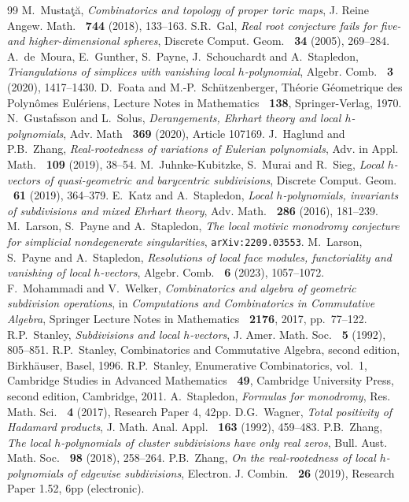 \documentclass[11pt]{amsart}
\begin{document}
\begin{thebibliography}{99}
M.~Musta\c{t}\u{a},
\textit{Combinatorics and topology of proper toric
maps},
J. Reine Angew. Math. {\bf~744} (2018), 133--163.
%
S.R.~Gal,
\textit{Real root conjecture fails for five- 
and higher-dimensional spheres},
Discrete Comput. Geom. {\bf~34} (2005), 269--284.
%
A.~de~Moura, E.~Gunther, S.~Payne, J.~Schouchardt
and A.~Stapledon,
\textit{Triangulations of simplices with vanishing 
local $h$-polynomial},
Algebr. Comb. {\bf~3} (2020), 1417--1430.
%
D.~Foata and M.-P.~Sch\"utzenberger,
Th\'eorie G\'eometrique des Polyn\^omes Eul\'eriens,
Lecture Notes in Mathematics {\bf~138}, 
Springer-Verlag, 1970.
%  
N.~Gustafsson and L.~Solus, 
\textit{Derangements, Ehrhart theory and local 
$h$-polynomials}, 
Adv. Math {\bf~369} (2020), Article 107169.
%
J.~Haglund and P.B.~Zhang,
\textit{Real-rootedness of variations of Eulerian 
polynomials},
Adv. in Appl. Math. {\bf~109} (2019), 38--54.
%
M.~Juhnke-Kubitzke, S.~Murai and R.~Sieg,
\textit{Local $h$-vectors of quasi-geometric and 
barycentric subdivisions},
Discrete Comput. Geom. {\bf~61} (2019), 364--379.
%
E.~Katz and A.~Stapledon,
\textit{Local $h$-polynomials, invariants of 
subdivisions and mixed Ehrhart theory},
Adv. Math. {\bf~286} (2016), 181--239.
%
M.~Larson, S.~Payne and A.~Stapledon,
\textit{The local motivic monodromy conjecture
for simplicial nondegenerate singularities},
{\tt arXiv:2209.03553}.
%
M.~Larson, S.~Payne and A.~Stapledon,
\textit{Resolutions of local face modules, 
functoriality and vanishing of local $h$-vectors},
Algebr. Comb. {\bf~6} (2023), 1057--1072.
%
F.~Mohammadi and V.~Welker,
\textit{Combinatorics and algebra of geometric 
subdivision operations},
in \textit{Computations and Combinatorics in 
Commutative Algebra},
Springer Lecture Notes in Mathematics {\bf~2176}, 
2017, pp.~77--122.
%
R.P.~Stanley,
\textit{Subdivisions and local $h$-vectors},
J. Amer. Math. Soc. {\bf~5} (1992), 805--851.
%
R.P.~Stanley,
Combinatorics and Commutative Algebra,
second edition, Birkh\"auser, Basel, 1996.
%
R.P.~Stanley,
Enumerative Combinatorics, vol.~1,
Cambridge Studies in Advanced Mathematics {\bf~49},
Cambridge University Press, second edition, 
Cambridge, 2011.
%
A.~Stapledon,
\textit{Formulas for monodromy},
Res. Math. Sci. {\bf~4} (2017), Research Paper 4, 
42pp.
%
D.G.~Wagner,
\textit{Total positivity of Hadamard products},
J. Math. Anal. Appl. {\bf~163} (1992), 459--483.
%
P.B.~Zhang,
\textit{The local $h$-polynomials of cluster 
subdivisions have only real zeros},
Bull. Aust. Math. Soc. {\bf~98} (2018), 258--264.
%
P.B.~Zhang,
\textit{On the real-rootedness of local 
$h$-polynomials of edgewise subdivisions},
Electron. J. Combin. {\bf~26} (2019), 
Research Paper 1.52, 6pp (electronic).
%
\end{thebibliography}
\end{document}
